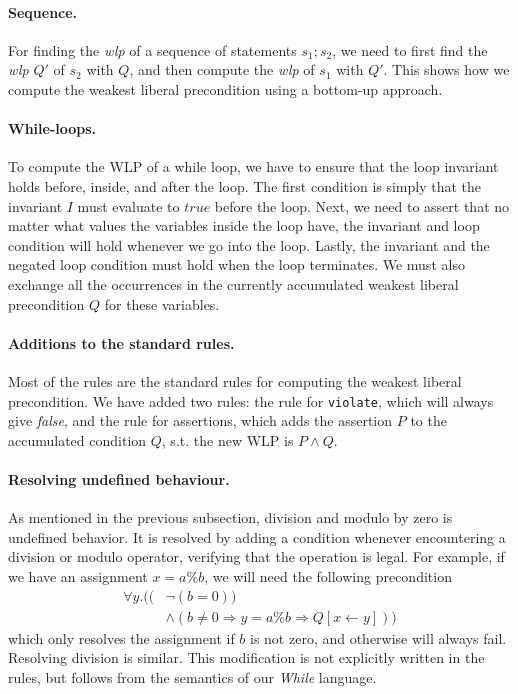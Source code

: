 \paragraph{Sequence.}
For finding the \textit{wlp} of a sequence of statements $s_1;s_2$, we need to first find the \textit{wlp} $Q'$ of $s_2$ with $Q$, and then compute the \textit{wlp} of $s_1$ with $Q'$.
This shows how we compute the weakest liberal precondition using a bottom-up approach.

\paragraph{While-loops.}
To compute the WLP of a while loop, we have to ensure that the loop invariant holds before, inside, and after the loop.
The first condition is simply that the invariant $I$ must evaluate to $true$ before the loop.
Next, we need to assert that no matter what values the variables inside the loop have, the invariant and loop condition will hold whenever we go into the loop.
Lastly, the invariant and the negated loop condition must hold when the loop terminates.
We must also exchange all the occurrences in the currently accumulated weakest liberal precondition $Q$ for these variables.

\paragraph{Additions to the standard rules.}
Most of the rules are the standard rules for computing the weakest liberal precondition.
We have added two rules: the rule for \texttt{violate}, which will always give \textit{false}, and the rule for assertions, which adds the assertion $P$ to the accumulated condition $Q$, s.t. the new WLP is $P \land Q$.

\paragraph{Resolving undefined behaviour.}
As mentioned in the previous subsection, division and modulo by zero is undefined behavior.
It is resolved by adding a condition whenever encountering a division or modulo operator, verifying that the operation is legal.
For example, if we have an assignment $x = a \% b$, we will need the following precondition
\begin{align*}
\forall y . ( (&\neg (b = 0)) \\
                &\land (b \neq 0 \Rightarrow y = a \% b \Rightarrow Q[x \leftarrow y]))
\end{align*}
which only resolves the assignment if $b$ is not zero, and otherwise will always fail. Resolving division is similar.
This modification is not explicitly written in the rules, but follows from the semantics of our \textit{While} language.

